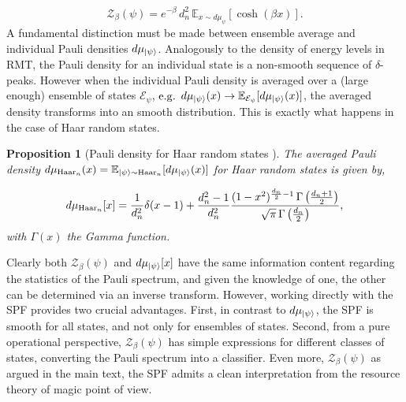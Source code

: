 \documentclass[aps,pra,superscriptaddress,twocolumn,longbibliography]{revtex4-2}
\newtheorem{proposition}{Proposition}
\begin{document}
\begin{equation}
    \mathcal{Z}_{\beta}(\psi)=e^{-\beta}\,d_{n}^{2}\,\mathbb{E}_{x\sim d\mu_{\psi}}[\cosh{(\beta x)}].
\end{equation}
%
A fundamental distinction must be made between ensemble average and individual Pauli densities $d\mu_{\ket{\psi}}$. Analogously to the density of energy levels in RMT, the Pauli density for an individual state is a non-smooth sequence of $\delta$-peaks. However when the individual Pauli density is averaged over a (large enough) ensemble of states $\mathcal{E}_{\psi}$, ${\rm e.g.}$ $d\mu_{\ket{\psi}}(x) \to \mathbb{E}_{\mathcal{E}_{\psi}}[d\mu_{\ket{\psi}}(x)]$, the averaged density transforms into an smooth distribution. This is exactly what happens in the case of Haar random states.

\begin{proposition}[Pauli density for Haar random states \cite{Turkeshi/Pauli_spectrum/2025}]

The averaged Pauli density $d\mu_{{\rm Haar}_{n}}(x)=\mathbb{E}_{\ket{\psi} \sim {\rm Haar}_{n}}[d\mu_{\ket{\psi}}(x)]$ for Haar random states is given by,

\begin{equation}
    d\mu_{{\rm Haar}_{n}}[x]=\frac{1}{d_{n}^{2}}\delta(x-1)+\frac{d_{n}^{2}-1}{d_{n}^{2}}\frac{(1-x^{2})^{\frac{d_{n}}{2}-1}\,\Gamma\left(\frac{d_{n}+1}{2}\right)}{\sqrt{\pi}\,\Gamma\left(\frac{d_{n}}{2}\right)},
\end{equation}
%
with $\Gamma(x)$ the Gamma function.
\end{proposition}

Clearly both $\mathcal{Z}_{\beta}(\psi)$ and $d\mu_{\ket{\psi}}[x]$ have the same information content regarding the statistics of the Pauli spectrum, and given the knowledge of one, the other can be determined via an inverse transform.
However, working directly with the SPF provides two crucial advantages.
First, in contrast to $d\mu_{\ket{\psi}}$, the SPF is smooth for all states, and not only for ensembles of states. Second, from a pure operational perspective, $\mathcal{Z}_{\beta}(\psi)$ has simple expressions for different classes of states, converting the Pauli spectrum into a classifier. Even more, $\mathcal{Z}_{\beta}(\psi)$ as argued in the main text, the SPF admits a clean interpretation from the resource theory of magic point of view. 
\end{document}
